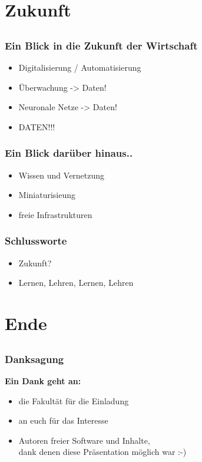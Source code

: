 \documentclass[12pt]{beamer}
\begin{document}

\section{Zukunft}
  \subsection{}
  
\begin{frame}
	\frametitle{Ein Blick in die Zukunft der Wirtschaft}
	\begin{itemize}
		\item<1-> Digitalisierung / Automatisierung
		\item<2-> Überwachung -> Daten!
		\item<3-> Neuronale Netze -> Daten!
		\item<4-> DATEN!!!		
	\end{itemize}
\end{frame}

\begin{frame}
	\frametitle{Ein Blick darüber hinaus..}
	\begin{itemize}
		\item<1-> Wissen und Vernetzung
		\item<2-> Miniaturisieung
		\item<3-> freie Infrastrukturen
	\end{itemize}
\end{frame}


\begin{frame}
	\frametitle{Schlussworte}
	\begin{itemize}
		\item<1-> Zukunft?
		\item<2-> Lernen, Lehren, Lernen, Lehren
	\end{itemize}
\end{frame}

\section{Ende}
	\subsection{}

\begin{frame}
	\frametitle{Danksagung}
	\begin{center}
		\textbf{Ein Dank geht an:}
		\begin{itemize}
			\item<1-> die Fakultät für die Einladung
			\item<2-> an euch für das Interesse
			\item<3-> Autoren freier Software und Inhalte,\\ dank denen diese Präsentation möglich war  :-)
		\end{itemize}
	\end{center}
\end{frame}
  
\end{document}
